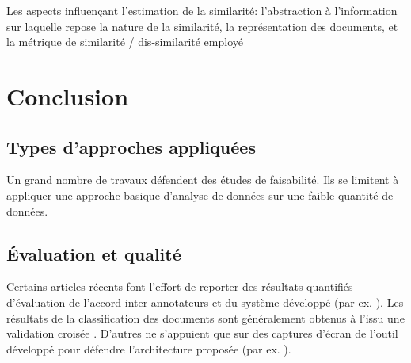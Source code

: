 \cite{kumar2011judgmentsimilarity, nair2018judgsimassorule, branting2017autoJudiDocAnalysis}

Les aspects influençant l'estimation de la similarité: l'abstraction à l'information sur laquelle repose la nature de la similarité, la représentation des documents, et la métrique de similarité / dis-similarité employé

\section{Conclusion}
\label{sec:literature:conclusion}
\subsection{Types d'approches appliquées}
Un grand nombre de travaux défendent des études de faisabilité. Ils se limitent à appliquer une approche basique d'analyse de données sur une faible quantité de données.


\subsection{Évaluation et qualité}
 Certains articles récents font l'effort de reporter des résultats quantifiés d'évaluation de l'accord inter-annotateurs et du système développé (par ex. \citep{Shulayeva2017recognfactprincip}). Les résultats de la classification des documents sont généralement obtenus à l'issu une validation croisée \cite{Sulea2017predictareadecision,sulea2017legalEnsSVM,Aletras2016predictDecisionECHR}. D'autres ne s'appuient que sur des captures d'écran de l'outil développé pour défendre l'architecture proposée (par ex. \citep{wyner2010extractlegalelts,Waltl2016lexia}).


